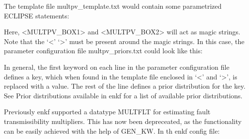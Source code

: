 \documentclass[letterpaper,10pt,english]{sphinxmanual}
\begin{document}
\begin{sphinxShadowBox}
%
\begin{sphinxVerbatim}[commandchars=\\\{\}]
  
\end{sphinxVerbatim}

The template file multpv\_template.txt would contain some parametrized ECLIPSE
statements:

%
\begin{sphinxVerbatim}[commandchars=\\\{\}]
       
  

       
  
\end{sphinxVerbatim}

Here, \textless{}MULTPV\_BOX1\textgreater{} and \textless{}MULTPV\_BOX2\textgreater{} will act as magic strings. Note that the
‘\textless{}’ ‘\textgreater{}’ must be present around the magic strings. In this case, the parameter
configuration file multpv\_priors.txt could look like this:

%
\begin{sphinxVerbatim}[commandchars=\\\{\}]
   
   
\end{sphinxVerbatim}

In general, the first keyword on each line in the parameter configuration file
defines a key, which when found in the template file enclosed in ‘\textless{}’ and ‘\textgreater{}’,
is replaced with a value. The rest of the line defines a prior distribution
for the key. See Prior distributions available in enkf for a list of available
prior distributions.


Previously enkf supported a datatype MULTFLT for estimating fault
transmissibility multipliers. This has now been depreceated, as the
functionality can be easily achieved with the help of GEN\_KW. In th enkf
config file:


\end{sphinxShadowBox}
\end{document}
